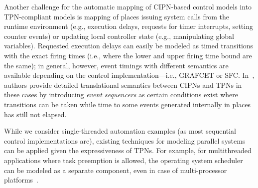 {Another challenge for the automatic mapping of CIPN-based control models into TPN-compliant models is mapping of places issuing system calls from the runtime environment (e.g., execution delays, requests for timer interrupts, setting counter events) or updating local controller state (e.g., manipulating global variables). Requested execution delays can easily be modeled as timed transitions with the exact firing times (i.e., where the lower and upper firing time bound are the same); in general, however, event timings with different semantics are available depending on the control implementation---i.e., GRAFCET or SFC. In~\cite{GRAFCETtoTPN,SFCtoTPN}, authors provide detailed translational semantics between CIPNs and TPNs in these cases by introducing \emph{event sequencers} as certain conditions exist where transitions can be taken while time to some events generated internally in places has still not elapsed.%
\begin{remark}
While we consider single-threaded automation examples (as most sequential control implementations are), existing techniques for modeling parallel systems can be applied given the expressiveness of TPNs. For example, for multithreaded applications where task preemption is allowed, the operating system scheduler can be modeled as a separate component, even in case of multi-processor platforms~\cite{TPNscheduling}. %
%
\QEDE
\end{remark}

}
